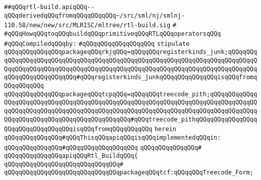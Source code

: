 \label{src/lib/compiler/back/low/treecode/rtl-build.api}
\verb|##qQQqrtl-build.apiqQQq--qQQqderivedqQQqfromqQQqqQQqqQQq~/src/sml/nj/smlnj-110.58/new/new/src/MLRISC/mltree/rtl-build.sig|\newline
\verb|#|\newline
\verb|#qQQqHowqQQqtoqQQqbuildqQQqprimitiveqQQqRTLqQQqoperatorsqQQq|\newline
\newline
\verb|#qQQqCompiledqQQqby:|\newline
\verb|#qQQqqQQqqQQqqQQqqQQq|\newline
\newline
\verb|stipulate|\newline
\verb|qQQqqQQqqQQqqQQqpackageqQQqrkjqQQq=qQQqqQQqregisterkinds_junk;qQQqqQQqqQQqqQQqqQQqqQQqqQQqqQQqqQQqqQQqqQQqqQQqqQQqqQQqqQQqqQQqqQQqqQQqqQQqqQQqqQQqqQQqqQQqqQQqqQQqqQQqqQQqqQQqqQQqqQQqqQQqqQQqqQQqqQQqqQQqqQQqqQQqqQQqqQQqqQQqqQQqqQQq#qQQqregisterkinds_junkqQQqqQQqqQQqqQQqisqQQqfromqQQqqQQqqQQq|\newline
\verb|qQQqqQQqqQQqqQQqpackageqQQqtcpqQQq=qQQqqQQqtreecode_pith;qQQqqQQqqQQqqQQqqQQqqQQqqQQqqQQqqQQqqQQqqQQqqQQqqQQqqQQqqQQqqQQqqQQqqQQqqQQqqQQqqQQqqQQqqQQqqQQqqQQqqQQqqQQqqQQqqQQqqQQqqQQqqQQqqQQqqQQqqQQqqQQqqQQqqQQqqQQqqQQqqQQqqQQqqQQqqQQqqQQqqQQqqQQq#qQQqtreecode_pithqQQqqQQqqQQqqQQqqQQqqQQqqQQqqQQqqQQqisqQQqfromqQQqqQQqqQQq|\newline
\verb|herein|\newline
\newline
\verb|qQQqqQQqqQQqqQQq#qQQqThisqQQqapiqQQqisqQQqimplementedqQQqin:|\newline
\verb|qQQqqQQqqQQqqQQq#qQQqqQQqqQQqqQQqqQQq|\newline
\verb|qQQqqQQqqQQqqQQq#|\newline
\verb|qQQqqQQqqQQqqQQqapiqQQqRtl_BuildqQQq{|\newline
\verb|qQQqqQQqqQQqqQQqqQQqqQQqqQQqqQQq#|\newline
\verb|qQQqqQQqqQQqqQQqqQQqqQQqqQQqqQQqpackageqQQqtcf:qQQqqQQqTreecode_Form;|\newline

